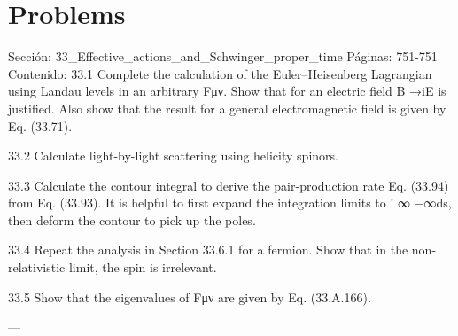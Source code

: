 \section*{Problems}
Sección: 33_Effective_actions_and_Schwinger_proper_time
Páginas: 751-751
Contenido:
33.1 Complete the calculation of the Euler–Heisenberg Lagrangian using Landau levels
in an arbitrary Fμν. Show that for an electric ﬁeld B →iE is justiﬁed. Also show
that the result for a general electromagnetic ﬁeld is given by Eq. (33.71).

33.2 Calculate light-by-light scattering using helicity spinors.

33.3 Calculate the contour integral to derive the pair-production rate Eq. (33.94) from
Eq. (33.93). It is helpful to ﬁrst expand the integration limits to
! ∞
−∞ds, then deform
the contour to pick up the poles.

33.4 Repeat the analysis in Section 33.6.1 for a fermion. Show that in the non-relativistic
limit, the spin is irrelevant.

33.5 Show that the eigenvalues of Fμν are given by Eq. (33.A.166).


---

